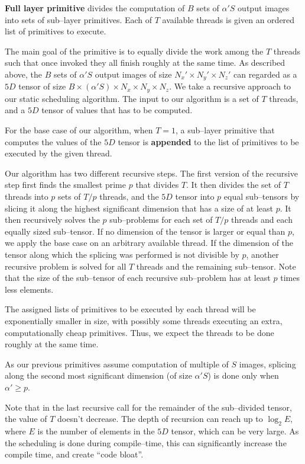   {\bf Full layer primitive} divides the computation of $B$ sets of
  $\alpha' S$ output images into sets of sub--layer primitives.  Each
  of $T$ available threads is given an ordered list of primitives to
  execute.

  The main goal of the primitive is to equally divide the work among
  the $T$ threads such that once invoked they all finish roughly at
  the same time.  As described above, the $B$ sets of $\alpha'S$
  output images of size $N_x' \times N_y' \times N_z'$ can regarded as
  a $5D$ tensor of size $B \times (\alpha'S) \times N_x \times N_y
  \times N_z$.  We take a recursive approach to our static scheduling
  algorithm.  The input to our algorithm is a set of $T$ threads, and
  a $5D$ tensor of values that has to be computed.

  For the base case of our algorithm, when $T=1$, a sub--layer
  primitive that computes the values of the $5D$ tensor is {\bf
    appended} to the list of primitives to be executed by the given
  thread.

  Our algorithm has two different recursive steps.  The first version
  of the recursive step first finds the smallest prime $p$ that
  divides $T$.  It then divides the set of $T$ threads into $p$ sets
  of $T/p$ threads, and the $5D$ tensor into $p$ equal sub--tensors by
  slicing it along the highest significant dimension that has a size
  of at least $p$.  It then recursively solves the $p$ sub--problems
  for each set of $T/p$ threads and each equally sized sub--tensor.
  If no dimension of the tensor is larger or equal than $p$, we apply
  the base case on an arbitrary available thread.  If the dimension of
  the tensor along which the splicing was performed is not divisible
  by $p$, another recursive problem is solved for all $T$ threads and
  the remaining sub--tensor.  Note that the size of the sub--tensor of
  each recursive sub--problem has at least $p$ times less elements.

  The assigned lists of primitives to be executed by each thread will
  be exponentially smaller in size, with possibly some threads
  executing an extra, computationally cheap primitives.  Thus, we
  expect the threads to be done roughly at the same time.

  As our previous primitives assume computation of multiple of $S$
  images, splicing along the second most significant dimension (of
  size $\alpha'S$) is done only when $\alpha' \ge p$.

  Note that in the last recursive call for the remainder of the
  sub--divided tensor, the value of $T$ doesn't decrease.  The depth
  of recursion can reach up to $\log_2 E$, where $E$ is the number of
  elements in the $5D$ tensor, which can be very large.  As the
  scheduling is done during compile--time, this can significantly
  increase the compile time, and create ``code bloat''.

